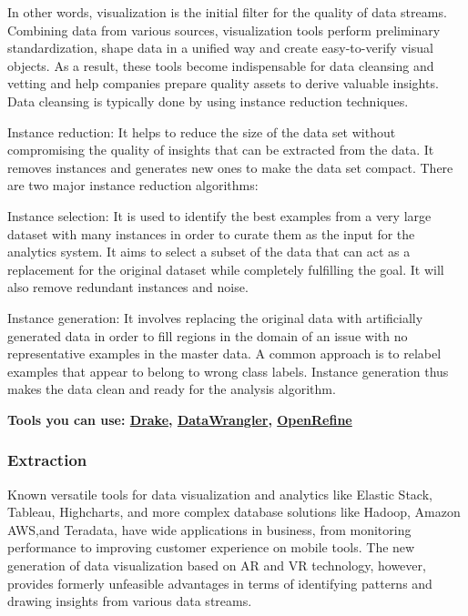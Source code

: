 \documentclass[]{book}
\begin{document}
In other words, visualization is the initial filter for the quality of data streams. Combining data from various sources, visualization tools perform preliminary standardization, shape data in a unified way and create easy-to-verify visual objects. As a result, these tools become indispensable for data cleansing and vetting and help companies prepare quality assets to derive valuable insights. Data cleansing is typically done by using instance reduction techniques.

Instance reduction: It helps to reduce the size of the data set without compromising the quality of insights that can be extracted from the data. It removes instances and generates new ones to make the data set compact. There are two major instance reduction algorithms:

Instance selection: It is used to identify the best examples from a very large dataset with many instances in order to curate them as the input for the analytics system. It aims to select a subset of the data that can act as a replacement for the original dataset while completely fulfilling the goal. It will also remove redundant instances and noise.

Instance generation: It involves replacing the original data with artificially generated data in order to fill regions in the domain of an issue with no representative examples in the master data. A common approach is to relabel examples that appear to belong to wrong class labels. Instance generation thus makes the data clean and ready for the analysis algorithm.

\textbf{Tools you can use: \href{https://www.factual.com/blog/introducing-drake-a-kind-of-make-for-data/}{Drake}, \href{http://vis.stanford.edu/wrangler/}{DataWrangler}, \href{http://openrefine.org/}{OpenRefine}}

\hypertarget{extraction}{%
\subsubsection{Extraction}\label{extraction}}

Known versatile tools for data visualization and analytics like Elastic Stack, Tableau, Highcharts, and more complex database solutions like Hadoop, Amazon AWS,and Teradata, have wide applications in business, from monitoring performance to improving customer experience on mobile tools. The new generation of data visualization based on AR and VR technology, however, provides formerly unfeasible advantages in terms of identifying patterns and drawing insights from various data streams.
\end{document}
